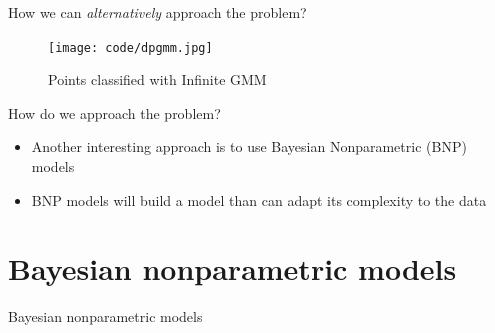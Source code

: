 \documentclass[handout]{beamer}
\begin{document}
\begin{frame}{How we can \textit{alternatively} approach the problem?}
    {\centering
    \begin{figure}[H]
        \texttt{[image: code/dpgmm.jpg]}
        \caption{Points classified with Infinite GMM}
    \end{figure}
    }
\end{frame}

\begin{frame}{How do we approach the problem?}
	\begin{itemize}
        \item Another interesting approach is to use Bayesian Nonparametric (BNP) models
        \item BNP models will build a model than can adapt its complexity to the data
	\end{itemize}
\end{frame}

\section{Bayesian nonparametric models}
\begin{frame}{Bayesian nonparametric models}

    \begin{figure}[H]
        \centering
        
    \end{figure}

\end{frame}
\end{document}
